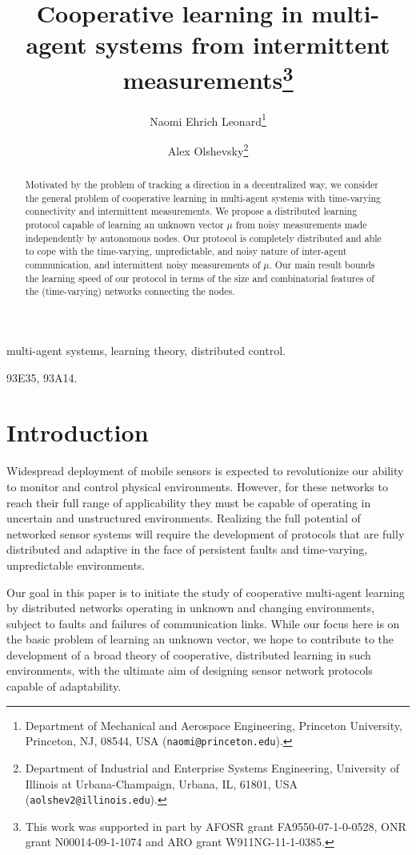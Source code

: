 \documentclass[final]{siamltex}
\title{Cooperative learning in multi-agent systems from intermittent measurements\thanks{This work was supported in part by AFOSR grant FA9550-07-1-0-0528, ONR grant N00014-09-1-1074 and ARO grant W911NG-11-1-0385.}}
\author{Naomi Ehrich Leonard\thanks{Department of Mechanical and Aerospace Engineering, Princeton University, Princeton, NJ, 08544, USA ({\tt naomi@princeton.edu}).}
        \and Alex Olshevsky\thanks{Department of Industrial and Enterprise Systems Engineering, University of Illinois at Urbana-Champaign, Urbana, IL, 61801, USA ({\tt aolshev2@illinois.edu}).  }}
\begin{document}
\maketitle

\begin{abstract} Motivated by the problem of tracking a direction in a decentralized way, we consider the general problem of cooperative learning in multi-agent systems with time-varying connectivity and intermittent measurements. We propose a distributed learning protocol capable of learning an unknown vector $\mu$ from noisy measurements made independently by autonomous nodes. Our protocol is completely distributed and  able to cope with the time-varying, unpredictable, {{{and noisy}}} nature of inter-agent communication, and intermittent noisy measurements of $\mu$. Our main result bounds the learning speed of our protocol in terms of the size and combinatorial features of the (time-varying) networks connecting the nodes. 
\end{abstract}

\begin{keywords} multi-agent systems, learning theory, distributed control.
\end{keywords}

\begin{AMS} 93E35, 93A14. 
\end{AMS}

\pagestyle{myheadings}
\thispagestyle{plain}

\section{Introduction\label{intro}}

Widespread deployment of mobile sensors is expected to revolutionize
our ability to monitor and control physical environments. However, for these networks 
to reach their full range of applicability they must be capable of
operating in uncertain and unstructured environments. Realizing
the full potential of networked sensor systems will require the development of protocols that are fully
distributed and adaptive in the face of persistent faults and time-varying,
unpredictable environments. 

{{{Our goal in this paper is to initiate the study of cooperative multi-agent learning by distributed
networks operating in unknown and changing environments, subject to faults and failures of 
communication links. While our focus here is on the basic problem of learning an unknown vector, 
we hope to contribute to the development of a broad theory of cooperative, distributed learning in such environments, with 
the ultimate aim of designing sensor network protocols capable of adaptability. }}}
\end{document}
